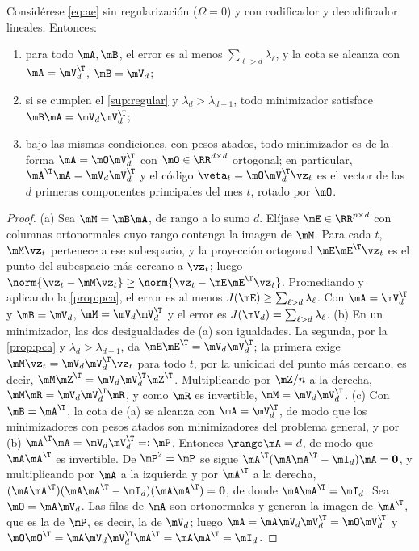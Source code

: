 \begin{proposicion}\label{prop:ae-lineal}
Considérese \cref{eq:ae} sin regularización ($\Omega=0$) y con codificador y decodificador
lineales. Entonces:
\begin{enumerate}[label=(\alph*)]
  \item para todo $\mA,\mB$, el error es al menos $\sum_{\ell>d}\lambda_\ell$, y la cota se
    alcanza con $\mA=\mV_d^{\T}$, $\mB=\mV_d$;
  \item si se cumplen el \cref{sup:regular} y $\lambda_d>\lambda_{d+1}$, todo minimizador
    satisface $\mB\mA=\mV_d\mV_d^{\T}$;
  \item bajo las mismas condiciones, con pesos atados, todo minimizador es de la forma
    $\mA=\mO\mV_d^{\T}$ con $\mO\in\RR^{d\times d}$ ortogonal; en particular,
    $\mA^{\T}\mA=\mV_d\mV_d^{\T}$ y el código $\veta_t=\mO\mV_d^{\T}\vz_t$ es el vector de las $d$
    primeras componentes principales del mes $t$, rotado por $\mO$.
\end{enumerate}
\end{proposicion}

\begin{proof}
(a) Sea $\mM=\mB\mA$, de rango a lo sumo $d$. Elíjase $\mE\in\RR^{p\times d}$ con columnas
ortonormales cuyo rango contenga la imagen de $\mM$. Para cada $t$, $\mM\vz_t$ pertenece a ese
subespacio, y la proyección ortogonal $\mE\mE^{\T}\vz_t$ es el punto del subespacio más cercano a
$\vz_t$; luego $\norm{\vz_t-\mM\vz_t}\ge\norm{\vz_t-\mE\mE^{\T}\vz_t}$. Promediando y aplicando la
\cref{prop:pca}, el error es al menos $J(\mE)\ge\sum_{\ell>d}\lambda_\ell$. Con $\mA=\mV_d^{\T}$ y
$\mB=\mV_d$, $\mM=\mV_d\mV_d^{\T}$ y el error es $J(\mV_d)=\sum_{\ell>d}\lambda_\ell$.
(b) En un minimizador, las dos desigualdades de (a) son igualdades. La segunda, por la
\cref{prop:pca} y $\lambda_d>\lambda_{d+1}$, da $\mE\mE^{\T}=\mV_d\mV_d^{\T}$; la primera exige
$\mM\vz_t=\mV_d\mV_d^{\T}\vz_t$ para todo $t$, por la unicidad del punto más cercano, es decir, $\mM\mZ^{\T}=\mV_d\mV_d^{\T}\mZ^{\T}$.
Multiplicando por $\mZ/n$ a la derecha, $\mM\mR=\mV_d\mV_d^{\T}\mR$, y como $\mR$ es invertible,
$\mM=\mV_d\mV_d^{\T}$. (c) Con $\mB=\mA^{\T}$, la cota de (a) se alcanza con $\mA=\mV_d^{\T}$, de
modo que los minimizadores con pesos atados son minimizadores del problema general, y por (b)
$\mA^{\T}\mA=\mV_d\mV_d^{\T}=:\mP$. Entonces $\rango\mA=d$, de modo que $\mA\mA^{\T}$ es invertible.
De $\mP^2=\mP$ se sigue $\mA^{\T}(\mA\mA^{\T}-\mI_d)\mA=\mathbf{0}$, y multiplicando por $\mA$ a
la izquierda y por $\mA^{\T}$ a la derecha, $(\mA\mA^{\T})(\mA\mA^{\T}-\mI_d)(\mA\mA^{\T})=
\mathbf{0}$, de donde $\mA\mA^{\T}=\mI_d$. Sea $\mO=\mA\mV_d$. Las filas de $\mA$ son ortonormales y
generan la imagen de $\mA^{\T}$, que es la de $\mP$, es decir, la de $\mV_d$; luego
$\mA=\mA\mV_d\mV_d^{\T}=\mO\mV_d^{\T}$ y $\mO\mO^{\T}=\mA\mV_d\mV_d^{\T}\mA^{\T}=\mA\mA^{\T}=\mI_d$.
\end{proof}

